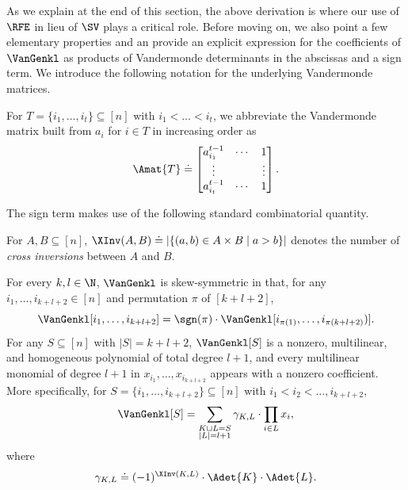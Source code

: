 \documentclass{toc}
\begin{document}
As we explain at the end of this section, the above derivation is where our use of $\RFE$ in lieu of $\SV$ plays a critical role. Before moving on, we also point a few elementary properties and an provide an explicit expression for the coefficients of $\VanGenkl$ as products of Vandermonde determinants in the abscissas and a sign term. We introduce the following notation for the underlying Vandermonde matrices.
\begin{definition}
For $T=\{i_1, \dots, i_t\} \subseteq [n]$  with $i_1 < \dots < i_t$, we abbreviate the Vandermonde matrix built from $a_i$ for $i \in T$ in increasing order as
\begin{equation}
  \label{eq.vandermonde-rep}
  \Amat{T}
  \doteq
  \begin{bmatrix}
    a_{i_1}^{t-1} & \cdots & 1 \\
    \vdots & & \vdots \\
    a_{i_t}^{t-1} & \cdots & 1
  \end{bmatrix}.
\end{equation}
\end{definition}
The sign term makes use of the following standard combinatorial quantity.
\begin{definition}
For $A,B \subseteq [n]$, $\XInv(A,B) \doteq |\{ (a,b)\in A\times B \mid a>b \}|$ denotes the number of \emph{cross inversions} between $A$ and $B$.
\end{definition}
\begin{proposition}\label{prop.vangen.basic}
  For every \(k,l \in \N\), 
  \(\VanGenkl\) is skew-symmetric in that,
  for any \(i_1,\ldots,i_{k+l+2} \in [n]\) and permutation \(\pi\) of $[k+l+2]$,
  \[
    \VanGenkl[i_1,\ldots, i_{k+l+2}]
    =
    \sgn(\pi)\cdot
    \VanGenkl[i_{\pi(1)},\ldots,i_{\pi(k+l+2)})].
  \]
  For any $S \subseteq [n]$ with $|S|=k+l+2$, $\VanGenkl[S]$ is a nonzero, multilinear, and homogeneous polynomial of total degree \(l+1\),
  and every multilinear monomial of degree $l+1$ in
  \(x_{i_1},\ldots,x_{i_{k+l+2}}\) appears with a nonzero coefficient. More specifically, for $S = \{i_1, \dots, i_{k+l+2}\} \subseteq [n]$ with $i_1 < i_2 < \dots, i_{k+l+2}$,
  \begin{equation}
    \label{eq.EVC.expanded}
      \VanGenkl[S] = \sum_{\substack{K\sqcup L= S \\ |L|=l+1}}
      \gamma_{K,L} \cdot \prod_{i \in L} x_i,
  \end{equation}
  where
  \begin{equation} \label{eq-EVC-coef}
    \gamma_{K,L} \doteq (-1)^{\XInv(K,L)} \cdot \Adet{K} \cdot \Adet{L}.
\end{equation}    
\end{proposition}
\end{document}
